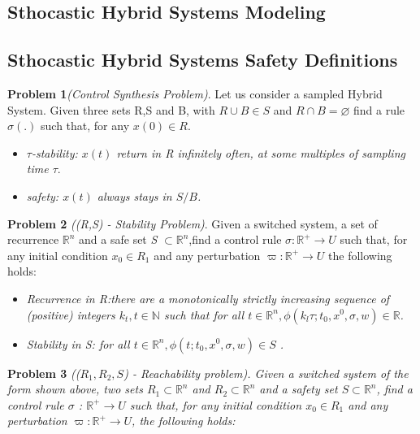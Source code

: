 \documentclass[conference]{IEEEtran}
\begin{document}
\subsection{Sthocastic Hybrid Systems Modeling}


\subsection{Sthocastic Hybrid Systems Safety Definitions}

  \textbf{Problem 1}\emph{(Control Synthesis Problem)}. Let us 
consider a sampled Hybrid System. Given three sets R,S and B, 
with ${R \cup B \in S}$  and ${R \cap B = \varnothing }$ find a 
rule ${\sigma(.)}$ such that, for any ${x(0) \in R }$. 

\begin{itemize}
    \item \emph{ ${\tau}$-stability: ${x(t)}$ return in R 
    infinitely often, at some multiples of sampling time ${\tau}$}.
    \item \emph{ safety: ${x(t)}$ always stays in ${S/B}$.}
\end{itemize}




 \textbf{Problem 2} \emph{((R,S) - Stability Problem)}. Given a 
 switched system, a set of recurrence 
 ${\mathbb{R}^n}$ and a safe set \emph{S} ${\subset \mathbb{R}^n}$,find a control rule 
 ${\sigma : \mathbb{R}^+ \rightarrow U}$ such that, for any
  initial condition ${x_0  \in  R_1}$ and any perturbation 
  ${\varpi :\mathbb{R}^+\rightarrow U}$  the
   following holds:
 
 \begin{itemize}
    \item \emph{ Recurrence in \emph{R}:there are a monotonically 
    strictly increasing sequence of (positive) integers
    ${k_t, t \in \mathbb{N}}$ such that for all ${ t \in \mathbb{R}^n,
    \phi(k_l\tau;t_0,x^0,\sigma,w) \in \mathbb{R} }$.}

    \item \emph{ Stability in \emph{S}: for all ${ t \in \mathbb{R}^n,
    \phi(t;t_0,x^0,\sigma,w) \in S}$ .}
\end{itemize}


 
\textbf{Problem 3} \emph{((${R_1,R_2,S}$) - Reachability problem).
Given a switched system of the form shown above, two sets  
${ R_1 \subset \mathbb{R}^n}$  and ${ R_2 \subset \mathbb{R}^n}$ 
and a safety set  ${S \subset  \mathbb{R}^n}$, find a control rule 
${\sigma}$ :
${\mathbb{R}^+\rightarrow U}$ such that, for any initial condition 
${x_0  \in  R_1}$ and any perturbation  ${\varpi : \mathbb{R}^+  
\rightarrow U}$, the following holds:}
\end{document}
